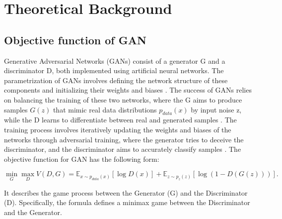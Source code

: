 \chapter{Theoretical Background}
\label{Theoretical Background for GAN}

\section*{Objective function of GAN}

Generative Adversarial Networks (GANs) consist of a generator G and a discriminator D, 
both implemented using artificial neural networks. The parametrization of GANs involves 
defining the network structure of these components and initializing their weights and biases \citep{10.1007/s10928-021-09787-4}. 
The success of GANs relies on balancing the training of these two networks, where the 
G aims to produce samples $G(z)$ that mimic real data distributions $p_{data}(x)$ by input noise z, while the D 
learns to differentiate between real and generated samples \citep{10.1109/taslp.2017.2761547}. 
The training process involves iteratively updating the weights and biases of the networks through 
adversarial training, where the generator tries to deceive the discriminator, and the discriminator 
aims to accurately classify samples \citep{10.48550/arxiv.1802.05637}.
The objective function for GAN has the following form:

\begin{equation}
    \min_{G} \max_{D} V(D, G) = \mathbb{E}_{x \sim p_{data}(x)} [\log D(x)] + \mathbb{E}_{z \sim p_{z}(z)} [\log(1 - D(G(z)))].
\end{equation}



It describes the game process between the Generator (G) and the Discriminator (D). Specifically, the formula defines a minimax game between the Discriminator and the Generator.


